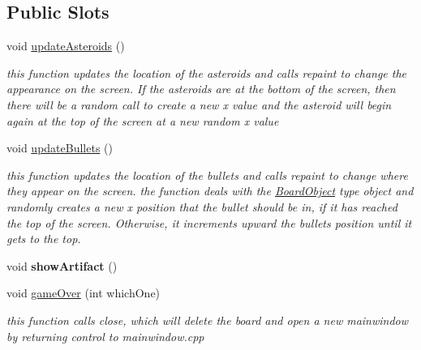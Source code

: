 \subsection*{Public Slots}
\begin{DoxyCompactItemize}
\item 
\hypertarget{class_board_a711a36645658f88b901a7a56e4c337b2}{}void \hyperlink{class_board_a711a36645658f88b901a7a56e4c337b2}{update\+Asteroids} ()\label{class_board_a711a36645658f88b901a7a56e4c337b2}

\begin{DoxyCompactList}\small\item\em this function updates the location of the asteroids and calls repaint to change the appearance on the screen. If the asteroids are at the bottom of the screen, then there will be a random call to create a new x value and the asteroid will begin again at the top of the screen at a new {\itshape random} x value \end{DoxyCompactList}\item 
\hypertarget{class_board_a3e1657fb8d53189f72cec42f6850b9d6}{}void \hyperlink{class_board_a3e1657fb8d53189f72cec42f6850b9d6}{update\+Bullets} ()\label{class_board_a3e1657fb8d53189f72cec42f6850b9d6}

\begin{DoxyCompactList}\small\item\em this function updates the location of the bullets and calls repaint to change where they appear on the screen. the function deals with the \hyperlink{class_board_object}{Board\+Object} type object and randomly creates a new x position that the bullet should be in, if it has reached the top of the screen. Otherwise, it increments upward the bullet\textquotesingle{}s position until it gets to the top. \end{DoxyCompactList}\item 
\hypertarget{class_board_ae3436060171ad62d54618c41c33b13cb}{}void {\bfseries show\+Artifact} ()\label{class_board_ae3436060171ad62d54618c41c33b13cb}

\item 
void \hyperlink{class_board_a0ce81a138f6787ee6a6f26dcf23863fd}{game\+Over} (int which\+One)
\begin{DoxyCompactList}\small\item\em this function calls close, which will delete the board and open a new mainwindow by returning control to mainwindow.\+cpp \end{DoxyCompactList}\end{DoxyCompactItemize}
